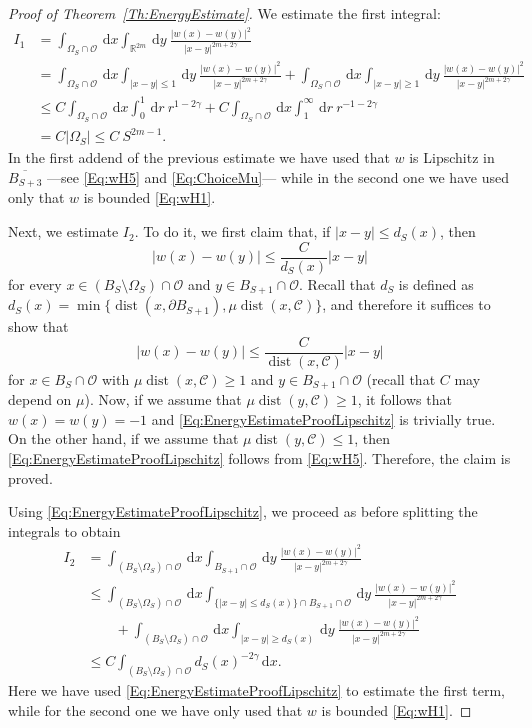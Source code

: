 \documentclass[12pt,reqno]{amsart}
\theoremstyle{definition}
\theoremstyle{remark}
\newcommand{\con}[1]{\mathbb{#1}}
\newcommand{\R}{\con{R}} %
\newcommand{\ccal}{\mathscr{C}}
\newcommand{\ocal}{\mathcal{O}}
\newcommand{\s}{\gamma}
\renewcommand{\d}{\,\mathrm{d}} %
\DeclareMathOperator{\dist}{dist}
\numberwithin{equation}{section}
\begin{document}
\begin{proof}[Proof of Theorem~\ref{Th:EnergyEstimate}]
	We estimate the first integral:
	\begin{align*}
	I_1 &= \int_{\Omega_{S}\cap \ocal} \d x \int_{\R^{2m}} \d y \  \frac{|w(x)-w(y)|^2}{|x-y|^{2m+2\s}} \\
	&= \int_{\Omega_{S}\cap \ocal} \d x \int_{|x-y|\leq 1} \d y \ \frac{|w(x)-w(y)|^2}{|x-y|^{2m+2\s}} + \int_{\Omega_{S}\cap \ocal} \d x \int_{|x-y|\geq 1} \d y \ \frac{|w(x)-w(y)|^2}{|x-y|^{2m+2\s}} \\
	&\leq C \int_{\Omega_{S}\cap \ocal} \d x \int_0^1 \d r \ r^{1-2\s} + C \int_{\Omega_{S}\cap \ocal} \d x \int_1^\infty \d r \ r^{-1-2\s} \\
	&= C |\Omega_S| \leq C \ S^{2m-1}.
	\end{align*}
	In the first addend of the previous estimate we have used that $w$ is Lipschitz in $\overline{B_{S+3}}$ ---see \eqref{Eq:wH5} and \eqref{Eq:ChoiceMu}--- while in the second one we have  used only that $w$ is bounded \eqref{Eq:wH1}. 
	
	Next, we estimate $I_2$. To do it, we first claim that, if $|x-y|\leq d_S(x)$, then
	\begin{equation}
	\label{Eq:EnergyEstimateProofLipschitz}
	|w(x)-w(y)| \leq \dfrac{C}{d_S(x)} |x-y|	
	\end{equation}
	for every $x\in (B_S\setminus \Omega_S)\cap \ocal$ and $y \in B_{S+1}\cap \ocal$. Recall that $d_S$ is defined as $d_S(x)=\min \{\dist(x,\partial B_{S+1}) , \mu \dist (x, \ccal)\}$, and therefore it suffices to show that
	$$
	|w(x)-w(y)| \leq \dfrac{C}{\dist (x, \ccal)} |x-y|
	$$
	for $x\in B_S \cap \ocal$ with $\mu \dist (x, \ccal) \geq 1$ and $y \in B_{S+1}\cap \ocal$ (recall that $C$ may depend on $\mu$). Now, if we assume that $\mu \dist (y, \ccal) \geq 1$, it follows that $w(x)=w(y)=-1$ and \eqref{Eq:EnergyEstimateProofLipschitz} is trivially true. On the other hand, if we assume that $\mu \dist (y, \ccal) \leq 1$, then \eqref{Eq:EnergyEstimateProofLipschitz} follows from \eqref{Eq:wH5}. Therefore, the claim is proved.
	
	Using \eqref{Eq:EnergyEstimateProofLipschitz}, we proceed as before splitting the integrals to obtain
	\begin{align*}
	I_2 &= \int_{(B_S\setminus \Omega_S)\cap \ocal} \d x \int_{B_{S+1}\cap \ocal} \d y \  \frac{|w(x)-w(y)|^2}{|x-y|^{2m+2\s}}   \\
	&\leq \int_{(B_S\setminus \Omega_S)\cap \ocal} \d x \int_{ \{|x-y|\leq d_S(x)\} \cap B_{S+1}\cap \ocal} \d y \  \frac{|w(x)-w(y)|^2}{|x-y|^{2m+2\s}} \\
	& \quad \quad + \int_{(B_S\setminus \Omega_S)\cap \ocal} \d x \int_{|x-y|\geq d_S(x)} \d y \ \frac{|w(x)-w(y)|^2}{|x-y|^{2m+2\s}} \\
	&\leq C \int_{(B_S\setminus \Omega_S)\cap \ocal} d_S(x)^{-2\s} \d x .
	\end{align*}
	Here we have used \eqref{Eq:EnergyEstimateProofLipschitz} to estimate the first term, while for the second one we have only used that $w$ is bounded \eqref{Eq:wH1}. 
	

\end{proof}
\end{document}
